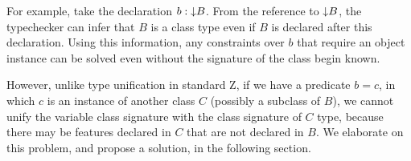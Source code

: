 For example, take the declaration $b : \mathord\downarrow B$. From the reference to
$\mathord\downarrow B$, the typechecker can infer that $B$ is a class type even if
$B$ is declared after this declaration. Using this information, any constraints
over $b$ that require an object instance can be solved even
without the signature of the class begin known.

However, unlike type unification in standard Z, if we have
a predicate $b = c$, in which $c$ is an instance of another class $C$
(possibly a subclass of $B$), we cannot unify the
variable class signature with the class signature of $C$ type, because
there may be features declared in $C$ that are not declared in
$B$. We elaborate on this problem, and propose a solution, 
in the following section.
